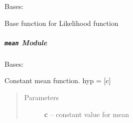\documentclass[letterpaper,10pt,english]{sphinxmanual}
\begin{document}
\begin{fulllineitems}
\label{pyGPs.Core:pyGPs.Core.lik.Likelihood}
Bases: 

Base function for Likelihood function

\begin{fulllineitems}
\label{pyGPs.Core:pyGPs.Core.lik.Likelihood.proceed}
\end{fulllineitems}


\end{fulllineitems}



\subparagraph{\texttt{mean} Module}
\label{pyGPs.Core:module-pyGPs.Core.mean}\label{pyGPs.Core:mean-module}

\begin{fulllineitems}
\label{pyGPs.Core:pyGPs.Core.mean.Const}
Bases: 

Constant mean function. hyp = {[}c{]}
\begin{quote}\begin{description}
\item[{Parameters}] \leavevmode
\textbf{c} -- constant value for mean

\end{description}\end{quote}

\begin{fulllineitems}
\label{pyGPs.Core:pyGPs.Core.mean.Const.getDerMatrix}
\end{fulllineitems}


\begin{fulllineitems}
\label{pyGPs.Core:pyGPs.Core.mean.Const.getMean}
\end{fulllineitems}


\end{fulllineitems}

\end{document}
